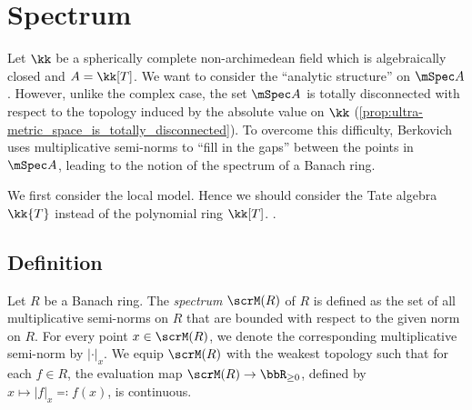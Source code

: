 \section{Spectrum}




    Let \(\kk\) be a spherically complete non-archimedean field which is algebraically closed and \(A = \kk[T]\).
    We want to consider the ``analytic structure'' on \(\mSpec A\).
    However, unlike the complex case, the set \(\mSpec A\) is totally disconnected with respect to the topology induced by the absolute value on \(\kk\) (\cref{prop:ultra-metric_space_is_totally_disconnected}).
    To overcome this difficulty, Berkovich uses multiplicative semi-norms to ``fill in the gaps'' between the points in \(\mSpec A\), leading to the notion of the spectrum of a Banach ring.

    We first consider the local model.
    Hence we should consider the Tate algebra \(\kk\{T\}\) instead of the polynomial ring \(\kk[T]\).
    .

\subsection{Definition}

    \begin{definition}\label{def:spectrum_of_Banach_rings}
        Let \(R\) be a Banach ring.
        The \emph{spectrum} \(\scrM(R)\) of \(R\) is defined as the set of all multiplicative semi-norms on \(R\) that are bounded with respect to the given norm on \(R\).
        For every point \(x \in \scrM(R)\), we denote the corresponding multiplicative semi-norm by \(|\cdot|_x\).
        We equip \(\scrM(R)\) with the weakest topology such that for each \(f \in R\), the evaluation map \(\scrM(R) \to \bbR_{\geq 0}\), defined by \(x \mapsto |f|_x\eqqcolon f(x)\), is continuous.
    \end{definition}
    
